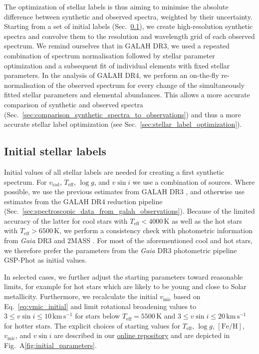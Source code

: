 \documentclass[
  journal=pasa,
  manuscript=research-paper, %
  year=2024,
  volume=37
]{cup-journal}
\newcommand{\Teff}{$T_\mathrm{eff}$\xspace}
\newcommand{\logg}{$\log g$\xspace}
\newcommand{\feh}{$\mathrm{[Fe/H]}$\xspace}
\newcommand{\vmic}{$v_\mathrm{mic}$\xspace}
\newcommand{\vsini}{$v \sin i$\xspace}
\newcommand{\vrad}{$v_\mathrm{rad}$\xspace}
\newcommand{\Gaia}{\textit{Gaia}\xspace}
\begin{document}
The optimization of stellar labels is thus aiming to minimise the absolute difference between synthetic and observed spectra, weighted by their uncertainty. Starting from a set of initial labels (Sec.~\ref{sec:initial_stellar_labels}), we create high-resolution synthetic spectra and convolve them to the resolution and wavelength grid of each observed spectrum. We remind ourselves that in GALAH DR3, we used a repeated combination of spectrum normalisation followed by stellar parameter optimization and a subsequent fit of individual elements with fixed stellar parameters. In the analysis of GALAH DR4, we perform an on-the-fly re-normalisation of the observed spectrum for every change of the simultaneously fitted stellar parameters and elemental abundances. This allows a more accurate comparison of synthetic and observed spectra (Sec.~\ref{sec:comparison_synthetic_spectra_to_observations}) and thus a more accurate stellar label optimization (see Sec.~\ref{sec:stellar_label_optimization}).

\subsection{Initial stellar labels}
\label{sec:initial_stellar_labels}


Initial values of all stellar labels are needed for creating a first synthetic spectrum. For \vrad, \Teff, \logg, and \vsini we use a combination of sources. Where possible, we use the previous estimates from GALAH DR3 \citep{Buder2021}, and otherwise use estimates from the GALAH DR4 reduction pipeline (Sec.~\ref{sec:spectroscopic_data_from_galah_observations}). Because of the limited accuracy of the latter for cool stars with $T_\text{eff} < 4000\,\mathrm{K}$ as well as the hot stars with $T_\text{eff} > 6500\,\mathrm{K}$, we perform a consistency check with photometric information from \Gaia DR3 \citep{Brown2021} and 2MASS \citep{Skrutskie2006}. For most of the aforementioned cool and hot stars, we therefore prefer the parameters from the \Gaia DR3 photometric pipeline GSP-Phot \citep{Andrae2022,Fouesneau2022} as initial values.

In selected cases, we further adjust the starting parameters toward reasonable limits, for example for hot stars which are likely to be young and close to Solar metallicity. Furthermore, we recalculate the initial \vmic based on Eq.~\ref{eq:vmic_initial} and limit rotational broadening values to $3 \leq v \sin i \leq 10\,\mathrm{km\,s^{-1}}$ for stars below $T_\text{eff} = 5500\,\mathrm{K}$ and $3 \leq v \sin i \leq 20\,\mathrm{km\,s^{-1}}$ for hotter stars. The explicit choices of starting values for \Teff, \logg, \feh, \vmic, and \vsini are described in our \href{https://github.com/svenbuder/GALAH_DR4/blob/main/spectrum_analysis/galah_dr4_initial_parameters.ipynb}{online repository} and are depicted in Fig.~A\ref{fig:initial_parameters}.
\end{document}
